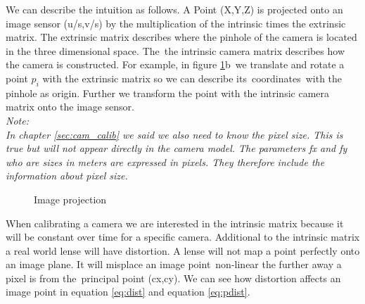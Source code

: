 \documentclass[11pt,a4paper,titlepage,oneside]{report}
\begin{document}
We can describe the intuition as follows. A Point (X,Y,Z) is projected onto an image sensor (u/s,v/s) by the multiplication of the intrinsic times the extrinsic matrix. The extrinsic matrix describes where the pinhole of the camera is located in the three dimensional space. The the intrinsic camera matrix describes how the camera is constructed. For example, in figure \ref{fig:projection}b we translate and rotate a point $p_i$ with the extrinsic matrix so we can describe its coordinates with the pinhole as origin. Further we transform the point with the intrinsic camera matrix onto the image sensor.\\
\em
Note:\\
In chapter \ref{sec:cam_calib} we said we also need to know the pixel size. This is true but will not appear directly in the camera model. The parameters fx and fy who are sizes in meters are expressed in pixels. They therefore include the information about pixel size.
\normalfont

\begin{figure}[H]
	\centering
	\caption{Image projection}\label{fig:projection}
\end{figure}

When calibrating a camera we are interested in the intrinsic matrix because it will be constant over time for a specific camera. Additional to the intrinsic matrix a real world lense will have distortion. A lense will not map a point perfectly onto an image plane. It will misplace an image point non-linear the further away a pixel is from the principal point (cx,cy). We can see how distortion affects an image point in equation \ref{eq:dist} and equation \ref{eq:pdist}.
\end{document}
